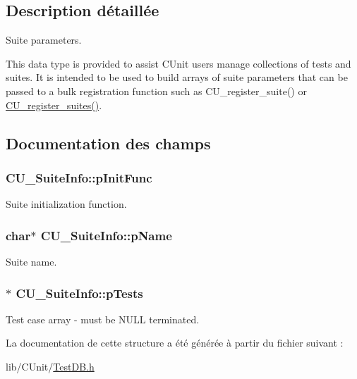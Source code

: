 \subsection{Description détaillée}
Suite parameters. 

This data type is provided to assist C\-Unit users manage collections of tests and suites. It is intended to be used to build arrays of suite parameters that can be passed to a bulk registration function such as C\-U\-\_\-register\-\_\-suite() or \hyperlink{group__Framework_ga331001da0a8bd8faececdb48e7ad3f96}{C\-U\-\_\-register\-\_\-suites()}. 

\subsection{Documentation des champs}
\hypertarget{structCU__SuiteInfo_a2716df9d804ab99c9b84b78b7f951aa2}{
\subsubsection[{p\-Init\-Func}]{ C\-U\-\_\-\-Suite\-Info\-::p\-Init\-Func}}\label{structCU__SuiteInfo_a2716df9d804ab99c9b84b78b7f951aa2}


Suite initialization function. 

\hypertarget{structCU__SuiteInfo_adfd97039a37a46383eba735f20dc4831}{
\subsubsection[{p\-Name}]{\setlength{\rightskip}{0pt plus 5cm}char$\ast$ C\-U\-\_\-\-Suite\-Info\-::p\-Name}}\label{structCU__SuiteInfo_adfd97039a37a46383eba735f20dc4831}


Suite name. 

\hypertarget{structCU__SuiteInfo_a1fdb8ec9bbc72962dbbc95f156856463}{
\subsubsection[{p\-Tests}]{$\ast$ C\-U\-\_\-\-Suite\-Info\-::p\-Tests}}\label{structCU__SuiteInfo_a1fdb8ec9bbc72962dbbc95f156856463}


Test case array -\/ must be N\-U\-L\-L terminated. 



La documentation de cette structure a été générée à partir du fichier suivant \-:\begin{DoxyCompactItemize}
\item 
lib/\-C\-Unit/\hyperlink{TestDB_8h}{Test\-D\-B.\-h}\end{DoxyCompactItemize}
